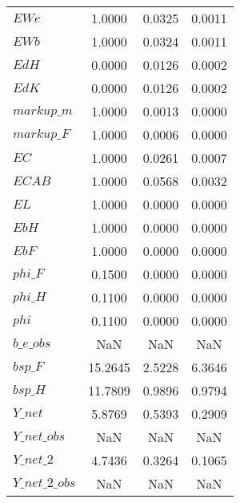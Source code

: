 \begin{center}
\begin{longtable}{lccc}
$EWe                        $	 & 	       1.0000	 & 	       0.0325	 & 	       0.0011 \\ 
$EWb                        $	 & 	       1.0000	 & 	       0.0324	 & 	       0.0011 \\ 
$EdH                        $	 & 	       0.0000	 & 	       0.0126	 & 	       0.0002 \\ 
$EdK                        $	 & 	       0.0000	 & 	       0.0126	 & 	       0.0002 \\ 
$markup\_m                  $	 & 	       1.0000	 & 	       0.0013	 & 	       0.0000 \\ 
$markup\_F                  $	 & 	       1.0000	 & 	       0.0006	 & 	       0.0000 \\ 
$EC                         $	 & 	       1.0000	 & 	       0.0261	 & 	       0.0007 \\ 
$ECAB                       $	 & 	       1.0000	 & 	       0.0568	 & 	       0.0032 \\ 
$EL                         $	 & 	       1.0000	 & 	       0.0000	 & 	       0.0000 \\ 
$EbH                        $	 & 	       1.0000	 & 	       0.0000	 & 	       0.0000 \\ 
$EbF                        $	 & 	       1.0000	 & 	       0.0000	 & 	       0.0000 \\ 
$phi\_F                     $	 & 	       0.1500	 & 	       0.0000	 & 	       0.0000 \\ 
$phi\_H                     $	 & 	       0.1100	 & 	       0.0000	 & 	       0.0000 \\ 
$phi                        $	 & 	       0.1100	 & 	       0.0000	 & 	       0.0000 \\ 
$b\_e\_obs                  $	 & 	          NaN	 & 	          NaN	 & 	          NaN \\ 
$bsp\_F                     $	 & 	      15.2645	 & 	       2.5228	 & 	       6.3646 \\ 
$bsp\_H                     $	 & 	      11.7809	 & 	       0.9896	 & 	       0.9794 \\ 
$Y\_net                     $	 & 	       5.8769	 & 	       0.5393	 & 	       0.2909 \\ 
$Y\_net\_obs                $	 & 	          NaN	 & 	          NaN	 & 	          NaN \\ 
$Y\_net\_2                  $	 & 	       4.7436	 & 	       0.3264	 & 	       0.1065 \\ 
$Y\_net\_2\_obs             $	 & 	          NaN	 & 	          NaN	 & 	          NaN \\ 

\end{longtable}
\end{center}
